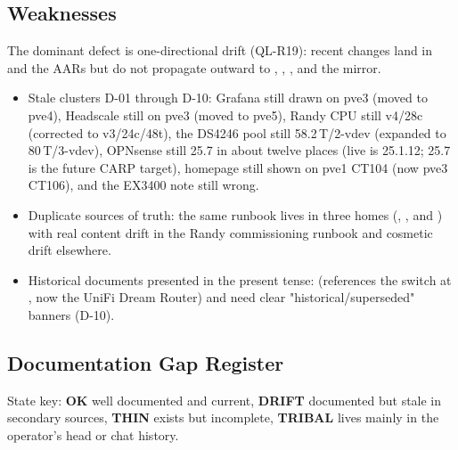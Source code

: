 \subsection{Weaknesses}

The dominant defect is \sevmed one-directional drift (QL-R19): recent changes land in  and the AARs but do not propagate outward to , , , and the  mirror.

\begin{itemize}
  \item Stale clusters D-01 through D-10: Grafana still drawn on pve3 (moved to pve4), Headscale still on pve3 (moved to pve5), Randy CPU still v4/28c (corrected to v3/24c/48t), the DS4246  pool still 58.2\,T/2-vdev (expanded to 80\,T/3-vdev), OPNsense still 25.7 in about twelve places (live is 25.1.12; 25.7 is the future CARP target), homepage still shown on pve1 CT104 (now pve3 CT106), and the EX3400  note still wrong.
  \item Duplicate sources of truth: the same runbook lives in three homes (, , and ) with real content drift in the Randy commissioning runbook and cosmetic drift elsewhere.
  \item Historical documents presented in the present tense:  (references the switch at , now the UniFi Dream Router) and  need clear "historical/superseded" banners (D-10).
\end{itemize}

\subsection{Documentation Gap Register}

State key: \textbf{OK} well documented and current, \textbf{DRIFT} documented but stale in secondary sources, \textbf{THIN} exists but incomplete, \textbf{TRIBAL} lives mainly in the operator's head or chat history.

